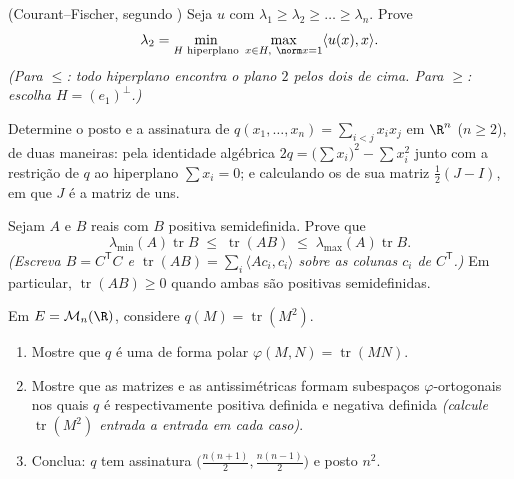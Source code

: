 \begin{exercise}[$\star\star\star$]\label{exo:b2:quadratic:9}
(Courant--Fischer, segundo ) Seja $u$  com
 $\lambda_1 \geq \lambda_2 \geq \dots \geq \lambda_n$.
Prove
\[
\lambda_2 = \min_{\substack{H \text{ hiperplano}}}\;
\max_{\substack{x \in H,\ \norm x = 1}} \langle u(x), x\rangle .
\]
\emph{(Para $\leq$: todo hiperplano encontra o plano $2$  pelos
dois  de cima. Para $\geq$: escolha $H =
(e_1)^{\perp}$.)}
\end{exercise}

\begin{exercise}[$\star\star$]\label{exo:b2:quadratic:10}
Determine o posto e a assinatura de $q(x_1, \dots, x_n) = \sum_{i <
j} x_ix_j$ em $\R^n$ ($n \geq 2$), de duas maneiras: pela
identidade algébrica $2q = \bigl(\sum x_i\bigr)^2 - \sum x_i^2$ junto
com a restrição de $q$ ao hiperplano $\sum x_i = 0$;
e calculando os  de sua matriz $\frac12(J - I)$,
em que $J$ é a matriz de uns.
\end{exercise}

\begin{exercise}[$\star\star$]\label{exo:b2:quadratic:11}
Sejam $A$ e $B$ reais  com $B$ positiva semidefinida.
Prove que
\[
\lambda_{\min}(A)\operatorname{tr} B
\;\leq\;
\operatorname{tr}(AB)
\;\leq\;
\lambda_{\max}(A)\operatorname{tr} B .
\]
\emph{(Escreva $B = C^{\mathsf T}C$ e $\operatorname{tr}(AB) =
\sum_i \langle A c_i, c_i\rangle$ sobre as colunas $c_i$ de
$C^{\mathsf T}$.)} Em particular, $\operatorname{tr}(AB) \geq 0$
quando ambas são positivas semidefinidas.
\end{exercise}

\begin{exercise}[$\star\star\star$]\label{exo:b2:quadratic:12}
Em $E = \mathcal{M}_n(\R)$, considere $q(M) =
\operatorname{tr}(M^2)$.
\begin{enumerate}
  \item Mostre que $q$ é uma  de forma polar
        $\varphi(M, N) = \operatorname{tr}(MN)$.
  \item Mostre que as matrizes  e as antissimétricas formam
        subespaços $\varphi$-ortogonais nos quais $q$ é
        respectivamente positiva definida e negativa definida
        \emph{(calcule $\operatorname{tr}(M^2)$ entrada a entrada em
        cada caso)}.
  \item Conclua: $q$ tem assinatura $\bigl(\frac{n(n+1)}{2},
        \frac{n(n-1)}{2}\bigr)$ e posto $n^2$.
\end{enumerate}
\end{exercise}

